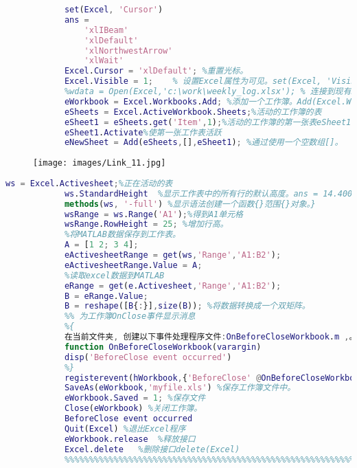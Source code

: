             \begin{lstlisting}[language=Matlab]
            %查看属性Cursor的所有可选属性值。Excel.set('属性', '属性值')
            set(Excel, 'Cursor')
            ans =
                'xlIBeam'
                'xlDefault'
                'xlNorthwestArrow'
                'xlWait'
            Excel.Cursor = 'xlDefault'; %重置光标。
            Excel.Visible = 1;    % 设置Excel属性为可见。set(Excel, 'Visible', 1);
            %wdata = Open(Excel,'c:\work\weekly_log.xlsx'); % 连接到现有Excel应用程序
            eWorkbook = Excel.Workbooks.Add; %添加一个工作簿。Add(Excel.Workbooks);
            eSheets = Excel.ActiveWorkbook.Sheets;%活动的工作簿的表
            eSheet1 = eSheets.get('Item',1);%活动的工作簿的第一张表eSheet1 = Item(eSheets,1);
            eSheet1.Activate%使第一张工作表活跃
            eNewSheet = Add(eSheets,[],eSheet1); %通过使用一个空数组[]。
            \end{lstlisting}
            \begin{figure}[H]
            \centering
            \texttt{[image: images/Link\_11.jpg]}
            \label{fig:Link_11}
            \end{figure}
            \begin{lstlisting}[language=Matlab]
            ws = Excel.Activesheet;%正在活动的表
            ws.StandardHeight  %显示工作表中的所有行的默认高度。ans = 14.4000
            methods(ws, '-full') %显示语法创建一个函数{}范围{}对象。}
            wsRange = ws.Range('A1');%得到A1单元格
            wsRange.RowHeight = 25; %增加行高。
            %将MATLAB数据保存到工作表。
            A = [1 2; 3 4];
            eActivesheetRange = get(ws,'Range','A1:B2');
            eActivesheetRange.Value = A;
            %读取excel数据到MATLAB
            eRange = get(e.Activesheet,'Range','A1:B2');
            B = eRange.Value;
            B = reshape([B{:}],size(B)); %将数据转换成一个双矩阵。
            %% 为工作簿OnClose事件显示消息
            %{
            在当前文件夹, 创建以下事件处理程序文件:OnBeforeCloseWorkbook.m ,。
            function OnBeforeCloseWorkbook(varargin)
            disp('BeforeClose event occurred')
            %}
            registerevent(hWorkbook,{'BeforeClose' @OnBeforeCloseWorkbook})%注册函数为 OnClose 事件。
            SaveAs(eWorkbook,'myfile.xls') %保存工作簿文件中。
            eWorkbook.Saved = 1; %保存文件
            Close(eWorkbook) %关闭工作簿。
            BeforeClose event occurred
            Quit(Excel) %退出Excel程序
            eWorkbook.release  %释放接口
            Excel.delete   %删除接口delete(Excel)
            %%%%%%%%%%%%%%%%%%%%%%%%%%%%%%%%%%%%%%%%%%%%%%%%%%%%%%%%%%%%%%%%%%%
            \end{lstlisting}
